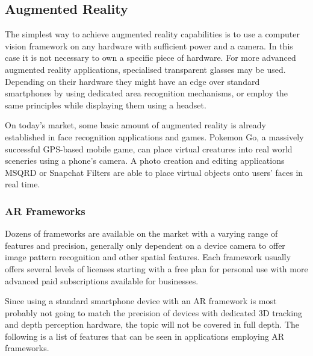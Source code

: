 \documentclass[12pt, a4paper]{article}
\begin{document}
\subsection{Augmented Reality}
The simplest way to achieve augmented reality capabilities is to use a computer vision framework on any hardware with sufficient power and a camera. In this case it is not necessary to own a specific piece of hardware. For more advanced augmented reality applications, specialised transparent glasses may be used. Depending on their hardware they might have an edge over standard smartphones by using dedicated area recognition mechanisms, or employ the same principles while displaying them using a headset.

On today’s market, some basic amount of augmented reality is already established in face recognition applications and games. Pokemon Go, a massively successful GPS-based mobile game, can place virtual creatures into real world sceneries using a phone’s camera. A photo creation and editing applications MSQRD or Snapchat Filters are able to place virtual objects onto users’ faces in real time.

\subsubsection{AR Frameworks}
Dozens of frameworks are available on the market with a varying range of features and precision, generally only dependent on a device camera to offer image pattern recognition and other spatial features. Each framework usually offers several levels of licenses starting with a free plan for personal use with more advanced paid subscriptions available for businesses.


Since using a standard smartphone device with an AR framework is most probably not going to match the precision of devices with dedicated 3D tracking and depth perception hardware, the topic will not be covered in full depth. The following is a list of features that can be seen in applications employing AR frameworks.
\end{document}
